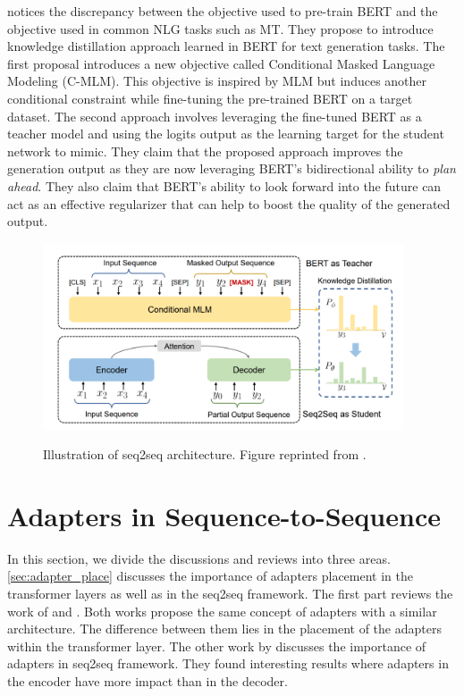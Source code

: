  notices the discrepancy between the objective used to pre-train BERT and the objective used in common NLG tasks such as MT. They propose to introduce knowledge distillation approach learned in BERT for text generation tasks. The first proposal introduces a new objective called Conditional Masked Language Modeling (C-MLM). This objective is inspired by MLM but induces another conditional constraint while fine-tuning the pre-trained BERT on a target dataset. The second approach involves leveraging the fine-tuned BERT as a teacher model and using the logits output as the learning target for the student network to mimic. They claim that the proposed approach improves the generation output as they are now leveraging BERT's bidirectional ability to \textit{plan ahead}. They also claim that BERT's ability to look forward into the future can act as an effective regularizer that can help to boost the quality of the generated output.

\begin{figure}[h]
    {\includegraphics[width=0.95\textwidth]{img/bert_distill.png}}
    \centering
    \caption{Illustration of seq2seq architecture. Figure reprinted from .}
    \label{img:bert_distill}
\end{figure}

\section{Adapters in Sequence-to-Sequence}
\label{sec:adapter_seq}

In this section, we divide the discussions and reviews into three areas. \cref{sec:adapter_place} discusses the importance of adapters placement in the transformer layers as well as in the seq2seq framework. The first part reviews the work of  and . Both works propose the same concept of adapters with a similar architecture. The difference between them lies in the placement of the adapters within the transformer layer. The other work by  discusses the importance of adapters in seq2seq framework. They found interesting results where adapters in the encoder have more impact than in the decoder.

